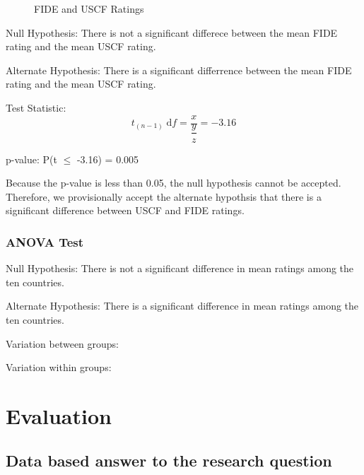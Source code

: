 \documentclass[12pt]{article}
\begin{document}
\begin{figure}[H]
\centering
{}
\caption{FIDE and USCF Ratings}
\end{figure}

Null Hypothesis: There is not a significant differece between the mean FIDE rating and the mean USCF rating.

Alternate Hypothesis: There is a significant differrence between the mean FIDE rating and the mean USCF rating. 

Test Statistic: 
\begin{equation}
    t_{(n-1)} \; \textrm{d}f = \dfrac{x}{\dfrac{y}{z}} = -3.16
\end{equation}

p-value: P(t \(\leq\) -3.16) = 0.005

Because the p-value is less than 0.05, the null hypothesis cannot be accepted. Therefore, we provisionally accept the alternate hypothsis that there is a significant difference between USCF and FIDE ratings.

\subsubsection{ANOVA Test}
Null Hypothesis: There is not a significant difference in mean ratings among the ten countries. 

Alternate Hypothesis: There is a significant difference in mean ratings among the ten countries. 

Variation between groups:

Variation within groups:


\section{Evaluation}
\subsection{Data based answer to the research question}
\end{document}
